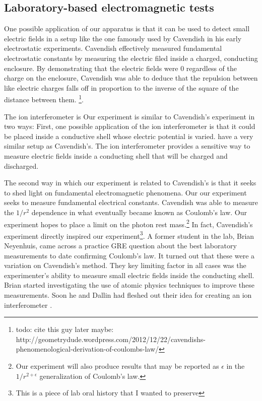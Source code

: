 \subsection{Laboratory-based electromagnetic tests}

One possible application of our apparatus is that it can be used  to detect small electric fields in a setup like the one famously used by Cavendish in his early electrostatic experiments. Cavendish effectively measured fundamental electrostatic constants by measuring the electric filed inside a charged, conducting enclosure. By demonstrating that the electric fields were 0 regardless of the charge on the enclosure, Cavendish was able to deduce that the repulsion between like electric charges falls off in proportion to the inverse of the square of the distance between them. \footnote{todo: cite this guy later maybe:  http://geometrydude.wordpress.com/2012/12/22/cavendishs-phenomenological-derivation-of-coulombs-law/}. 

The ion interferometer is Our experiment is similar to Cavendish's experiment in two ways: First, one possible application of the ion interferometer is that it could be placed inside a conductive shell whose electric potential is varied. have a very similar setup as Cavendish's. The ion interferometer provides a sensitive way to measure electric fields inside a conducting shell that will be charged and discharged. 

The second way in which our experiment is related to Cavendish's is that it seeks to shed light on fundamental electromagnetic phenomena. Our our experiment seeks to measure fundamental electrical constants. Cavendish was able to measure the $1/r^2$ dependence in what eventually became known as Coulomb's law. Our experiment hopes to place a limit on the photon rest mass.\footnote{Our experiment will also produce results that may be reported as $\epsilon$ in the $1/r^{2+\epsilon}$ generalization of Coulomb's law.}
In fact, Cavendish's experiment directly inspired our experiment\footnote{This is a piece of lab oral history that I wanted to preserve}. A former student in the lab, Brian Neyenhuis, came across a practice GRE question about the best laboratory measurements to date confirming Coulomb's law. It turned out that these were a variation on Cavendish's method. They key limiting factor in all cases was the experimenter's ability to measure small electric fields inside the conducting shell. Brian started investigating the use of atomic physics techniques to improve these measurements. Soon he and Dallin had fleshed out their idea for creating an ion interferometer \cite{NeyenhuisIon}\cite{christensen_arxiv_calcs}.  


